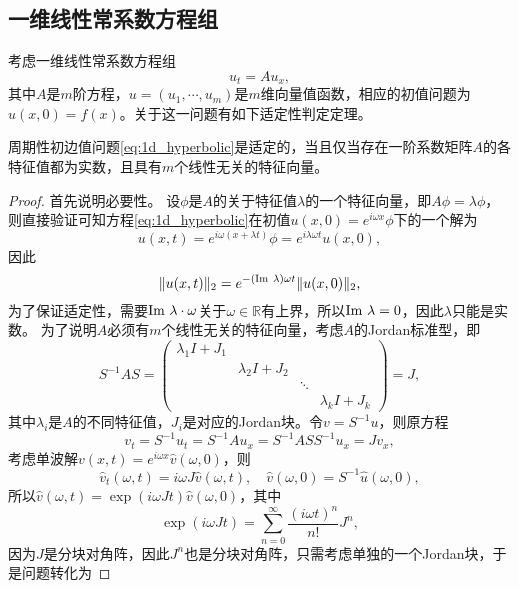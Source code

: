\documentclass[a4paper,10pt]{ctexart}
\begin{document}
\subsection{一维线性常系数方程组}
考虑一维线性常系数方程组
\begin{equation}\label{eq:1d_hyperbolic}
    u_t = Au_x,
\end{equation}
其中$ A $是$ m $阶方程，$ u = (u_1,\cdots,u_m) $是$ m $维向量值函数，相应的初值问题为$ u(x,0) = f(x) $。关于这一问题有如下适定性判定定理。
\begin{theorem}
    周期性初边值问题\eqref{eq:1d_hyperbolic}是适定的，当且仅当存在一阶系数矩阵$ A $的各特征值都为实数，且具有$ m $个线性无关的特征向量。
\end{theorem}
\begin{proof}
    首先说明必要性。
    设$ \phi $是$ A $的关于特征值$ \lambda $的一个特征向量，即$ A\phi = \lambda \phi $，则直接验证可知方程\eqref{eq:1d_hyperbolic}在初值$ u(x,0) = e^{i \omega x}\phi $下的一个解为
    \begin{equation}
        u(x,t) = e^{i \omega (x + \lambda t)} \phi = e^{i \lambda \omega t}u(x,0),
    \end{equation}
    因此
    \[
        \| u(x,t) \|_2 = e^{-({\rm Im}\ \lambda) \omega t} \| u(x,0) \|_2,
    \]
    为了保证适定性，需要$ {\rm Im}\ \lambda \cdot \omega $关于$ \omega \in \mathbb{R} $有上界，所以$ {\rm Im}\ \lambda = 0 $，因此$ \lambda $只能是实数。
    为了说明$ A $必须有$ m $个线性无关的特征向量，考虑$ A $的Jordan标准型，即
    \[
        S^{-1}AS = 
        \begin{pmatrix} 
            \lambda_1 I + J_1 & & & \\
            & \lambda_2 I + J_2 & & \\ 
            & & \ddots & \\
            & & & \lambda_k I + J_k
        \end{pmatrix}= J ,
    \]
    其中$ \lambda_i $是$ A $的不同特征值，$ J_i $是对应的Jordan块。令$ v = S^{-1}u $，则原方程
    \[
        v_t = S^{-1}u_t = S^{-1}Au_x = S^{-1}AS S^{-1}u_x = Jv_x,
    \]
    考虑单波解$ v(x,t) = e^{i \omega x}\hat{v}(\omega,0) $，则
    \[
        \hat{v}_t(\omega,t) = i \omega J\hat{v}(\omega,t), \quad \hat{v}(\omega,0) = S^{-1}\hat{u}(\omega,0),
    \]
    所以$ \hat{v}(\omega,t) = \exp(i \omega J t)\hat{v}(\omega,0) $，其中
    \[
        \exp(i \omega J t) = \sum_{n=0}^{\infty} \frac{(i \omega t)^n}{n!} J^n,
    \]
    因为$ J $是分块对角阵，因此$ J^n $也是分块对角阵，只需考虑单独的一个Jordan块，于是问题转化为

\end{proof}
\end{document}
